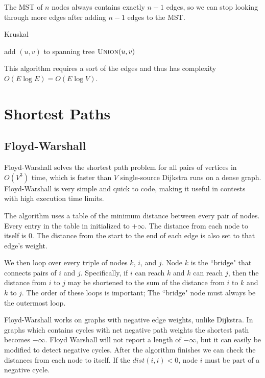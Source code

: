 \documentclass{article}
\begin{document}
The MST of $n$ nodes always contains exactly $n-1$ edges, so we can stop looking through more edges after adding $n-1$ edges to the MST.

\begin{algorithm}[H]
\caption{Kruskal}
\begin{algorithmic}
		\State add $(u,v)$ to spanning tree
		\State $\Call{Union}{u,v}$
	\EndIf
\EndFor
\end{algorithmic}
\end{algorithm}


This algorithm requires a sort of the edges and thus has complexity $O(E \log{E}) = O(E \log{V})$.

\section{Shortest Paths}

\subsection{Floyd-Warshall}

Floyd-Warshall solves the shortest path problem for all pairs of vertices in $O(V^3)$ time, which is faster than $V$ single-source Dijkstra runs on a dense graph. Floyd-Warshall is very simple and quick to code, making it useful in contests with high execution time limits.  

The algorithm uses a table of the minimum distance between every pair of nodes.  Every entry in the table in initialized to $+\infty$.  The distance from each node to itself is 0.  The distance from the start to the end of each edge is also set to that edge's weight.

We then loop over every triple of nodes $k$, $i$, and $j$.  Node $k$ is the ``bridge" that connects pairs of $i$ and $j$.  Specifically, if $i$ can reach $k$ and $k$ can reach $j$, then the distance from $i$ to $j$ may be shortened to the sum of the distance from $i$ to $k$ and $k$ to $j$.  The order of these loops is important;  The ``bridge" node must always be the outermost loop.

Floyd-Warshall works on graphs with negative edge weights, unlike Dijkstra.  In graphs which contains cycles with net negative path weights the shortest path becomes $-\infty$.  Floyd Warshall will not report a length of $-\infty$, but it can easily be modified to detect negative cycles.  After the algorithm finishes we can check the distances from each node to itself.  If the $dist(i,i)<0$, node $i$ must be part of a negative cycle.
\end{document}

